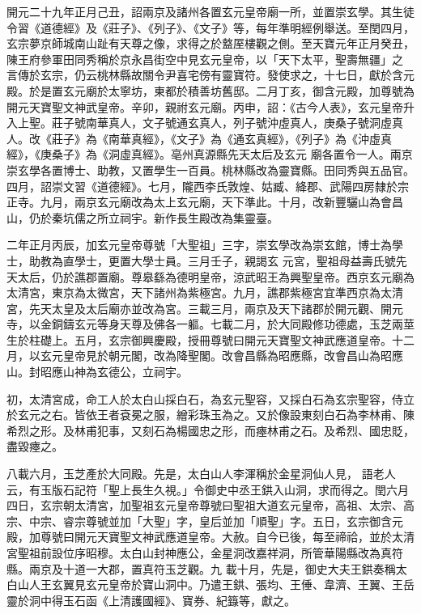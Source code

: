 \begin{pinyinscope}
 開元二十九年正月己丑，詔兩京及諸州各置玄元皇帝廟一所，並置崇玄學。其生徒令習《道德經》及《莊子》、《列子》、《文子》等，每年準明經例舉送。至閏四月，玄宗夢京師城南山趾有天尊之像，求得之於盩厔樓觀之側。至天寶元年正月癸丑，陳王府參軍田同秀稱於京永昌街空中見玄元皇帝，以「天下太平，聖壽無疆」之
 言傳於玄宗，仍云桃林縣故關令尹喜宅傍有靈寶符。發使求之，十七日，獻於含元殿。於是置玄元廟於太寧坊，東都於積善坊舊邸。二月丁亥，御含元殿，加尊號為開元天寶聖文神武皇帝。辛卯，親祔玄元廟。丙申，詔：《古今人表》，玄元皇帝升入上聖。莊子號南華真人，文子號通玄真人，列子號沖虛真人，庚桑子號洞虛真人。改《莊子》為《南華真經》，《文子》為《通玄真經》，《列子》為《沖虛真經》，《庚桑子》為《洞虛真經》。亳州真源縣先天太后及玄元
 廟各置令一人。兩京崇玄學各置博士、助教，又置學生一百員。桃林縣改為靈寶縣。田同秀與五品官。四月，詔崇文習《道德經》。七月，隴西李氏敦煌、姑臧、絳郡、武陽四房隸於宗正寺。九月，兩京玄元廟改為太上玄元廟，天下準此。十月，改新豐驪山為會昌山，仍於秦坑儒之所立祠宇。新作長生殿改為集靈臺。



 二年正月丙辰，加玄元皇帝尊號「大聖祖」三字，崇玄學改為崇玄館，博士為學士，助教為直學士，更置大學士員。三月壬子，親謁玄
 元宮，聖祖母益壽氏號先天太后，仍於譙郡置廟。尊皋繇為德明皇帝，涼武昭王為興聖皇帝。西京玄元廟為太清宮，東京為太微宮，天下諸州為紫極宮。九月，譙郡紫極宮宜準西京為太清宮，先天太皇及太后廟亦並改為宮。三載三月，兩京及天下諸郡於開元觀、開元寺，以金銅鑄玄元等身天尊及佛各一軀。七載二月，於大同殿修功德處，玉芝兩莖生於柱礎上。五月，玄宗御興慶殿，授冊尊號曰開元天寶聖文神武應道皇帝。十二
 月，以玄元皇帝見於朝元閣，改為降聖閣。改會昌縣為昭應縣，改會昌山為昭應山。封昭應山神為玄德公，立祠宇。



 初，太清宮成，命工人於太白山採白石，為玄元聖容，又採白石為玄宗聖容，侍立於玄元之右。皆依王者袞冕之服，繒彩珠玉為之。又於像設東刻白石為李林甫、陳希烈之形。及林甫犯事，又刻石為楊國忠之形，而瘞林甫之石。及希烈、國忠貶，盡毀瘞之。



 八載六月，玉芝產於大同殿。先是，太白山人李渾稱於金星洞仙人見，
 語老人云，有玉版石記符「聖上長生久視。」令御史中丞王鉷入山洞，求而得之。閏六月四日，玄宗朝太清宮，加聖祖玄元皇帝尊號曰聖祖大道玄元皇帝，高祖、太宗、高宗、中宗、睿宗尊號並加「大聖」字，皇后並加「順聖」字。五日，玄宗御含元殿，加尊號曰開元天寶聖文神武應道皇帝。大赦。自今已後，每至禘祫，並於太清宮聖祖前設位序昭穆。太白山封神應公，金星洞改嘉祥洞，所管華陽縣改為真符縣。兩京及十道一大郡，置真符玉芝觀。九
 載十月，先是，御史大夫王鉷奏稱太白山人王玄翼見玄元皇帝於寶山洞中。乃遣王鉷、張均、王倕、韋濟、王翼、王岳靈於洞中得玉石函《上清護國經》、寶券、紀籙等，獻之。




\end{pinyinscope}
